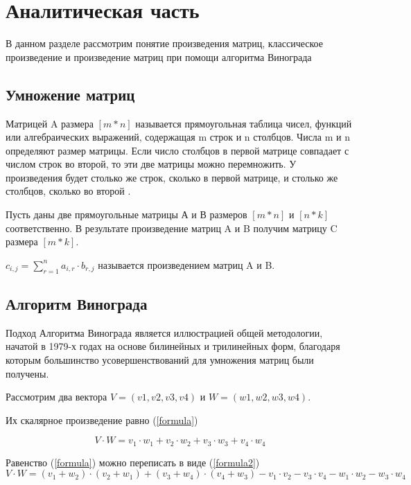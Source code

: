 \documentclass[utf8x, 12pt]{G7-32}
\begin{document}
\mainmatter %
\chapter{Аналитическая часть}
В данном разделе рассмотрим понятие произведения матриц, классическое произведение и произведение матриц при помощи алгоритма Винограда
\section{Умножение матриц}
Матрицей A размера $[m*n]$ называется прямоугольная таблица
чисел, функций или алгебраических выражений, содержащая m строк и n столбцов. Числа m и n определяют размер матрицы. Если число столбцов в первой матрице совпадает с числом строк во второй, то эти две матрицы можно перемножить. У произведения будет столько же строк, сколько в первой матрице, и столько же столбцов, сколько во второй \cite{link3}.
	    
Пусть даны две прямоугольные матрицы А и В размеров $[m * n]$ и $[n * k]$ соответственно.  
В результате произведение матриц A и B получим матрицу C размера $[m *  k]$.


$c_{i,j} = \sum\limits_{r=1}^n a_{i,r}\cdot b_{r,j}$ называется произведением матриц A и B.

\section{Алгоритм Винограда}
Подход Алгоритма Винограда является иллюстрацией общей методологии, начатой в 1979-х годах на основе
билинейных и трилинейных форм, благодаря которым большинство усовершенствований для умножения матриц были получены.

Рассмотрим два вектора $V = (v1, v2, v3, v4)$ и $W = (w1, w2, w3, w4)$.  

 Их скалярное произведение равно (\ref{formula}) 

\begin{equation} \label{formula}
V \cdot W=v_1 \cdot w_1 + v_2 \cdot w_2 + v_3 \cdot w_3 + v_4 \cdot w_4
\end{equation}

Равенство (\ref{formula}) можно переписать в виде (\ref{formula2}) 
\begin{equation} \label{formula2}
V \cdot W=(v_1 + w_2) \cdot (v_2 + w_1) + (v_3 + w_4) \cdot (v_4 + w_3) - v_1 \cdot v_2 - v_3 \cdot v_4 - w_1 \cdot w_2 - w_3 \cdot w_4
\end{equation}
\end{document}
